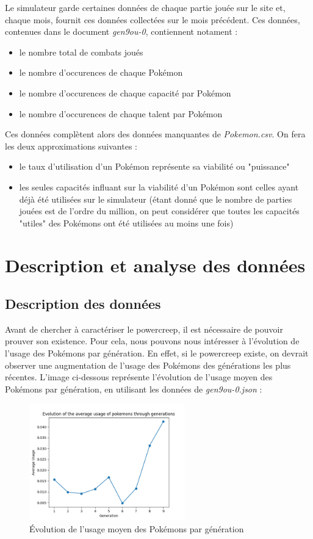 \documentclass[a4paper,12pt]{article}
\begin{document}
Le simulateur garde certaines données de chaque partie jouée sur le site et,
chaque mois, fournit ces données collectées sur le mois précédent. Ces données,
contenues dans le document \textit{gen9ou-0}, contiennent notament :
\begin{itemize}
    \item le nombre total de combats joués
    \item le nombre d'occurences de chaque Pokémon
    \item le nombre d'occurences de chaque capacité par Pokémon
    \item le nombre d'occurences de chaque talent par Pokémon
\end{itemize}
Ces données complètent alors des données manquantes de \textit{Pokemon.csv}. On
fera les deux approximations suivantes :
\begin{itemize}
    \item le taux d'utilisation d'un Pokémon représente sa viabilité ou
    "puissance"
    \item les seules capacités influant sur la viabilité d'un Pokémon sont
    celles ayant déjà été utilisées sur le simulateur (étant donné que le nombre
    de parties jouées est de l'ordre du million, on peut considérer que toutes
    les capacités "utiles" des Pokémons ont été utilisées au moins une fois)
\end{itemize}
\section{Description et analyse des données}
\subsection{Description des données}
Avant de chercher à caractériser le powercreep, il est nécessaire de pouvoir
prouver son existence. Pour cela, nous pouvons nous intéresser à l'évolution de
l'usage des Pokémons par génération. En effet, si le powercreep existe, on
devrait observer une augmentation de l'usage des Pokémons des générations les
plus récentes. L'image ci-dessous représente l'évolution de l'usage moyen des
Pokémons par génération, en utilisant les données de \textit{gen9ou-0.json} :
\begin{figure}[!h]
    \centering
    \includegraphics[width=0.6\textwidth]{Image/avg_usage_by_generation.png}
    \caption{Évolution de l'usage moyen des Pokémons par génération}
    \label{fig:image4}
\end{figure}
\end{document}
